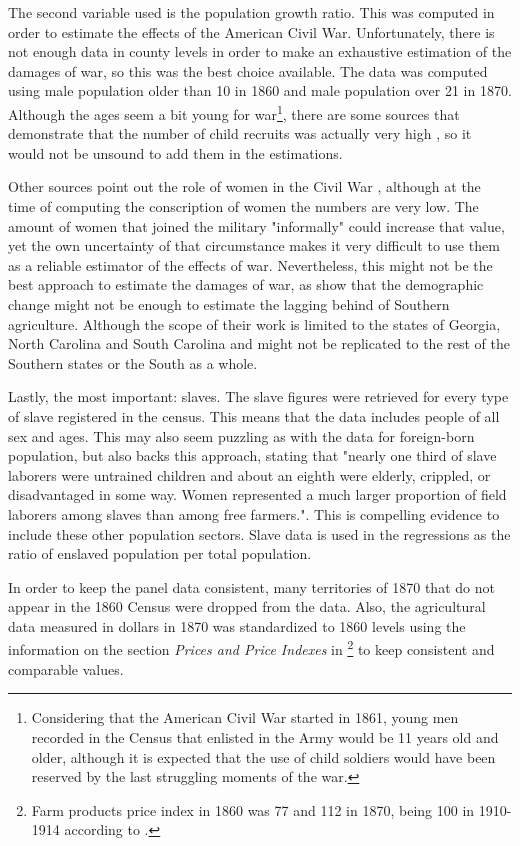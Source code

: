 \documentclass[12pt]{report}
\begin{document}
The second variable used is the population growth ratio. This was computed in order to estimate the effects of the American Civil War. Unfortunately, there is not enough data in county levels in order to make an exhaustive estimation of the damages of war, so this was the best choice available. The data was computed using male population older than 10 in 1860 and male population over 21 in 1870. Although the ages seem a bit young for war\footnote{Considering that the American Civil War started in 1861, young men recorded in the Census that enlisted in the Army would be 11 years old and older, although it is expected that the use of child soldiers would have been reserved by the last struggling moments of the war.}, there are some sources that demonstrate that the number of child recruits was actually very high \citep{murphy1993boys}, so it would not be unsound to add them in the estimations.

Other sources point out the role of women in the Civil War \citep{blanton2002they}, although at the time of computing the conscription of women the numbers are very low. The amount of women that joined the military "informally" could increase that value, yet the own uncertainty of that circumstance makes it very difficult to use them as a reliable estimator of the effects of war. Nevertheless, this might not be the best approach to estimate the damages of war, as \citet{feigenbaum2018capital} show that the demographic change might not be enough to estimate the lagging behind of Southern agriculture. Although the scope of their work is limited to the states of Georgia, North Carolina and South Carolina and might not be replicated to the rest of the Southern states or the South as a whole.

Lastly, the most important: slaves. The slave figures were retrieved for every type of slave registered in the census. This means that the data includes people of all sex and ages. This may also seem puzzling as with the data for foreign-born population, but \citet[73]{fogel1994without} also backs this approach, stating that "nearly one third of slave laborers were untrained children and about an eighth were elderly, crippled, or disadvantaged in some way. Women represented a much larger proportion of field laborers among slaves than among free farmers.". This is compelling evidence to include these other population sectors. Slave data is used in the regressions as the ratio of enslaved population per total population.

In order to keep the panel data consistent, many territories of 1870 that do not appear in the 1860 Census were dropped from the data. Also, the agricultural data measured in dollars in 1870 was standardized to 1860 levels using the information on the section \emph{Prices and Price Indexes} in \citet{histstat} \footnote{Farm products price index in 1860 was 77 and 112 in 1870, being 100 in 1910-1914 according to \citet{stine1933}.} to keep consistent and comparable values.
\end{document}

